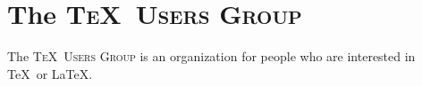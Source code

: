 \documentclass{article}
\newcommand{\TUG}{\textsc{\TeX\ Users Group}\xspace}
\begin{document}
\section{The \TUG}
The \TUG is an organization for people who are interested in
\TeX\ or \LaTeX.
\end{document}
